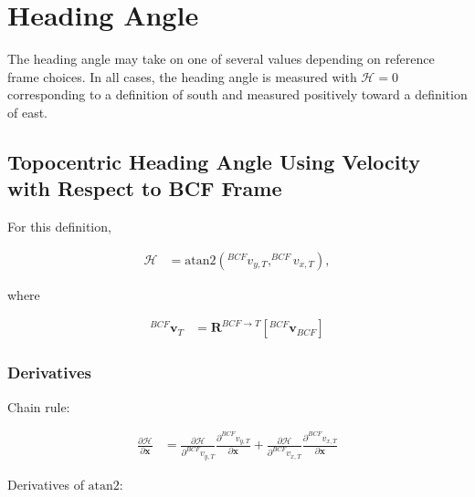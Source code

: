 \documentclass[]{article}
\newcommand{\vb}[1]{\bm{#1}} %
\newcommand{\pd}[2]{\frac{\partial #1}{\partial #2}} %
\begin{document}
\section{Heading Angle}

	
The heading angle may take on one of several values depending on reference frame choices. In all cases, the heading angle is measured with $\mathcal{H} = 0$ corresponding to a definition of south and measured positively toward a definition of east.

\subsection{Topocentric Heading Angle Using Velocity with Respect to BCF Frame}

For this definition,

\begin{align}
	\mathcal{H} &= \mathrm{atan2} \left( ^{BCF} {v}_{y, T}, ^{BCF} v_{x, T} \right),
\end{align}

\noindent where

\begin{align}
	^{BCF} \vb{v}_{T} &= \vb{R}^{BCF \rightarrow T} \left[ ^{BCF} \vb{v}_{BCF} \right]
\end{align}

\subsubsection{Derivatives}
\label{sec:heading_topo_bcf_derivatives}

Chain rule:

\begin{align}
	\pd{\mathcal{H}}{\vb{x}} &= \pd{\mathcal{H}}{^{BCF} v_{y, T}} \pd{^{BCF} v_{y, T}}{\vb{x}} + \pd{\mathcal{H}}{^{BCF} v_{x, T}} \pd{^{BCF} v_{x, T}}{\vb{x}}  
\end{align}

Derivatives of $\mathrm{atan2}$:
\end{document}
